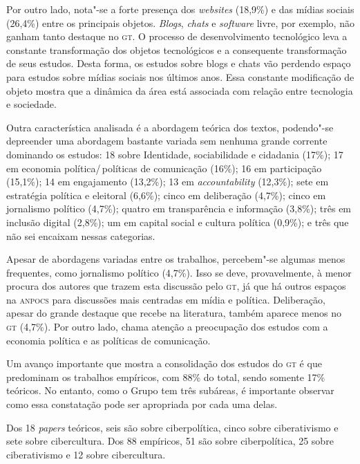 Por outro lado, nota"-se a forte presença dos \textit{websites} (18,9\%) e das
mídias sociais (26,4\%) entre os principais objetos. \textit{Blogs},
\textit{chats} e \textit{software} livre, por exemplo, não ganham tanto
destaque no \textsc{gt}. O processo de desenvolvimento tecnológico leva a
constante transformação dos objetos tecnológicos e a consequente
transformação de seus estudos. Desta forma, os estudos sobre blogs e
chats vão perdendo espaço para estudos sobre mídias sociais nos últimos
anos. Essa constante modificação de objeto mostra que a dinâmica da área
está associada com relação entre tecnologia e sociedade.

Outra característica analisada é a abordagem teórica dos textos,
podendo"-se depreender uma abordagem bastante variada sem nenhuma grande
corrente dominando os estudos: 18 sobre Identidade, sociabilidade e cidadania (17\%); 17 em economia política/\,políticas de comunicação (16\%); 16 em participação (15,1\%); 14 em engajamento (13,2\%); 13 em \textit{accountability} (12,3\%); sete em estratégia política e eleitoral (6,6\%); cinco em deliberação (4,7\%); cinco em jornalismo político (4,7\%); quatro em transparência e informação (3,8\%); três em inclusão digital (2,8\%); um em capital social e cultura política (0,9\%); e três que não sei encaixam nessas categorias.

Apesar de abordagens variadas entre os trabalhos, percebem"-se algumas
menos frequentes, como jornalismo político (4,7\%). Isso se deve,
provavelmente, à menor procura dos autores que trazem esta
discussão pelo \textsc{gt}, já que há outros espaços na \textsc{\textsc{anpocs}} para discussões
mais centradas em mídia e política. Deliberação, apesar do grande
destaque que recebe na literatura, também aparece menos no \textsc{gt} (4,7\%).
Por outro lado, chama atenção a preocupação dos estudos com a economia
política e as políticas de comunicação.

Um avanço importante que mostra a consolidação dos estudos do \textsc{gt} é que
predominam os trabalhos empíricos, com 88\% do total, sendo somente 17\%
teóricos. No entanto, como o Grupo tem três subáreas, é importante
observar como essa constatação pode ser apropriada por cada uma delas.

Dos 18 \textit{papers} teóricos, seis são sobre ciberpolítica, cinco sobre ciberativismo e sete sobre cibercultura. Dos 88 empíricos, 51 são sobre ciberpolítica, 25 sobre ciberativismo e 12 sobre cibercultura.

